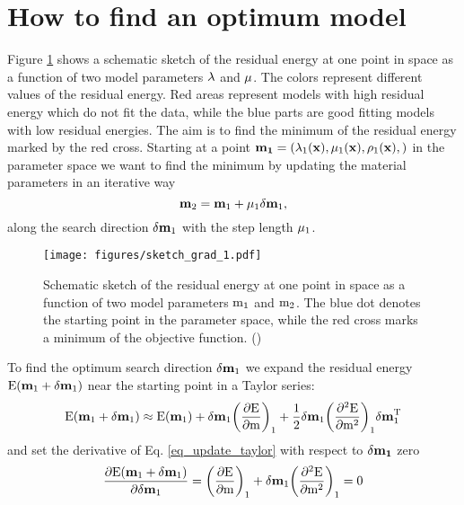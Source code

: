 \section{How to find an optimum model}
Figure \ref{sketch_grad} shows a schematic sketch of the residual energy at one point in space as a function of two model parameters 
$\rm{\lambda}$ and $\rm{\mu}$. The colors represent different values of the residual energy. Red areas represent models with high residual 
energy which do not fit the data, while the blue parts are good fitting models with low residual energies. The aim is to find the minimum of 
the residual energy marked by the red cross. Starting at a point $\rm{\mathbf{m_1} = (\lambda_1 (\mathbf{x}), \mu_1 (\mathbf{x}), \rho_1 (\mathbf{x}),)}$ in the parameter space we want to find the minimum by updating the material parameters in an iterative way
\begin{equation} 
\rm{\mathbf{m}_{2} = \mathbf{m}_{1} + \mu_1 \mathbf{\delta m}_{1}, }
\label{eq_update}
\end{equation}
along the search direction $\rm{\mathbf{\delta m}_{1}}$ with the step length $\rm{\mu_1}$. 
\begin{figure}[!bh]
\begin{center}
\texttt{[image: figures/sketch\_grad\_1.pdf]}
\caption{Schematic sketch of the residual energy at one point in space as a function of two model parameters $\rm{m_1}$ and $\rm{m_2}$. The blue dot denotes the starting point in the parameter space, while the red cross marks a minimum of the objective function. (\cite{koehn:11})}
\label{sketch_grad}
\end{center}
\end{figure} 
To find the optimum search direction $\rm{\mathbf{\delta m}_{1}}$ we expand the residual energy $\rm{E(\mathbf{m}_{1} + \mathbf{\delta m}_{1})}$ near the starting point in a Taylor series:
\begin{equation}
\rm{E(\mathbf{m}_{1} + \mathbf{\delta m}_{1}) \approx E(\mathbf{m}_{1}) + \mathbf{\delta m}_{1} \biggl(\frac{\partial E}{\partial m}\biggr)_1 + \frac{1}{2} \mathbf{\delta m}_{1} \biggl(\frac{\partial^2 E}{\partial m^2}\biggr)_1 \mathbf{\delta m}_{1}^T}   
\label{eq_update_taylor}
\end{equation} 
and set the derivative of Eq. \ref{eq_update_taylor} with respect to $\rm{\delta \mathbf{m_1}}$ zero
\begin{equation}
\rm{\frac{\partial E(\mathbf{m}_{1} + \mathbf{\delta m}_{1})}{\partial \mathbf{\delta m}_{1}} = \biggl(\frac{\partial E}{\partial m}\biggr)_1 + \mathbf{\delta m}_{1} \biggl(\frac{\partial^2 E}{\partial m^2}\biggr)_1 = 0}   
\label{eq_update_taylor_prime}
\end{equation} 
